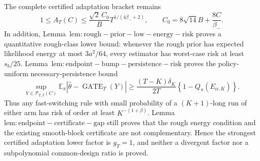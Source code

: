 The complete certified adaptation bracket remains
\[
1\le A_T(C)\le\frac{\sqrt2\,C_0}{B}T^{1/(4\beta_-+2)},
\qquad
C_0=8\sqrt{14}B+\frac{8C}{\beta_-}.
\]
In addition, Lemma~\(\mathrm{lem:rough-prior-low-energy-risk}\) proves a quantitative rough-class lower bound: whenever the rough prior has expected likelihood energy at most \(3a^2/64\), every estimator has worst-case risk at least \(s_b/25\). Lemma~\(\mathrm{lem:endpoint-bump-persistence-risk}\) proves the policy-uniform necessary-persistence bound
\[
\sup_{Y\in\mathcal P_{T,\beta}(C)}\mathbb E_\pi\left|\widehat\theta-\operatorname{GATE}_T(Y)\right|
\ge
\frac{(T-K)\delta_K}{2T}\left\{1-Q_\pi(E_{\alpha,K})\right\}.
\]
Thus any fast-switching rule with small probability of a \((K+1)\)-long run of either arm has risk of order at least \(K^{-(1+\beta)}\). Lemma~\(\mathrm{lem:endpoint-certificate-gap}\) still proves that the rough energy condition and the existing smooth-block certificate are not complementary. Hence the strongest certified adaptation lower factor is \(g_T=1\), and neither a divergent factor nor a subpolynomial common-design ratio is proved.